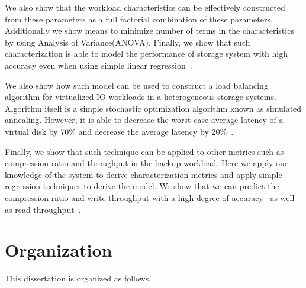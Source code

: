 We also show that the workload characteristics can be effectively constructed from these parameters as a full factorial combination of these parameters.
Additionally we show means to minimize number of terms in the characteristics by using Analysis of Variance(ANOVA).
Finally, we show that such characterization is able to model the performance of storage system with high accuracy even when using simple linear regression~\cite{park:2012}.

We also show how such model can be used to construct a load balancing algorithm for virtualized IO workloads in a heterogeneous storage systems. 
Algorithm itself is a simple stochastic optimization algorithm known as simulated annealing.
However, it is able to decrease the worst case average latency of a virtual disk by 70\% and decrease the average latency by 20\%~\cite{park:2012}.

Finally, we show that such technique can be applied to other metrics such as compression ratio and throughput in the backup workload. 
Here we apply our knowledge of the system to derive characterization metrics and apply simple regression techniques to derive the model.
We show that we can predict the compression ratio and write throughput with a high degree of accuracy~\cite{park:2010} as well as read throughput~\cite{nam:2011}.

\section{Organization}
This dissertation is organized as follows.

